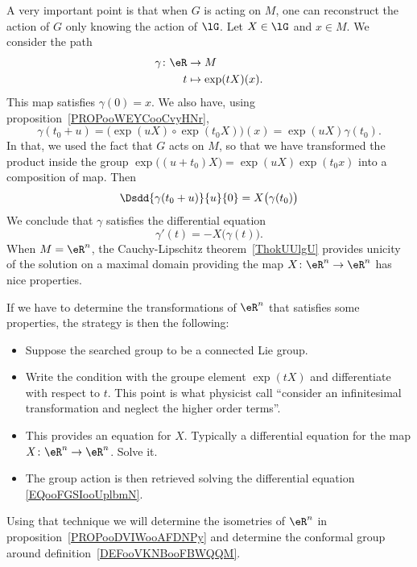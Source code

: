 A very important point\cite{ooOLNIooDLmxkR} is that when \( G\) is acting on $M$, one can reconstruct the action of \( G\) only knowing the action of \( \lG\). Let \( X\in \lG\) and \( x\in M\). We consider the path
\begin{equation}
	\begin{aligned}
		\gamma\colon \eR & \to M                \\
		t                & \mapsto \exp(tX)(x).
	\end{aligned}
\end{equation}
This map satisfies \( \gamma(0)=x\). We also have, using proposition~\ref{PROPooWEYCooCvyHNr},
\begin{equation}
	\gamma(t_0+u)=\big( \exp(uX)\circ\exp(t_0X)\big)(x)=\exp(uX)\gamma(t_0).
\end{equation}
In that, we used the fact that \( G\) acts on \( M\), so that we have transformed the product inside the group \( \exp\big( (u+t_0)X \big)= \exp(uX)\exp(t_0x) \) into a composition of map.  Then
\begin{equation}
	\Dsdd{ \gamma(t_0+u) }{u}{0}=X\big( \gamma(t_0) \big)
\end{equation}
We conclude that \( \gamma\) satisfies the differential equation
\begin{equation}        \label{EQooFGSIooUplbmN}
	\gamma'(t)=-X\big( \gamma(t) \big).
\end{equation}
When \( M=\eR^n\), the Cauchy-Lipschitz theorem~\ref{ThokUUlgU} provides unicity of the solution on a maximal domain providing the map \( X\colon \eR^n\to \eR^n\) has nice properties.

\begin{normaltext}      \label{NORMooMGAUooIoLtjW}
	If we have to determine the transformations of \( \eR^n\) that satisfies some properties, the strategy is then the following:
	\begin{itemize}
		\item Suppose the searched group to be a connected Lie group.
		\item Write the condition with the groupe element \( \exp(tX)\) and differentiate with respect to \( t\). This point is what physicist call ``consider an infinitesimal transformation and neglect the higher order terms''.
		\item This provides an equation for \( X\). Typically a differential equation for the map \( X\colon \eR^n\to \eR^n\). Solve it.
		\item The group action is then retrieved solving the differential equation \eqref{EQooFGSIooUplbmN}.
	\end{itemize}
	Using that technique we will determine the isometries of \( \eR^n\) in proposition~\ref{PROPooDVIWooAFDNPy} and determine the conformal group around definition~\ref{DEFooVKNBooFBWQQM}.  %
\end{normaltext}


